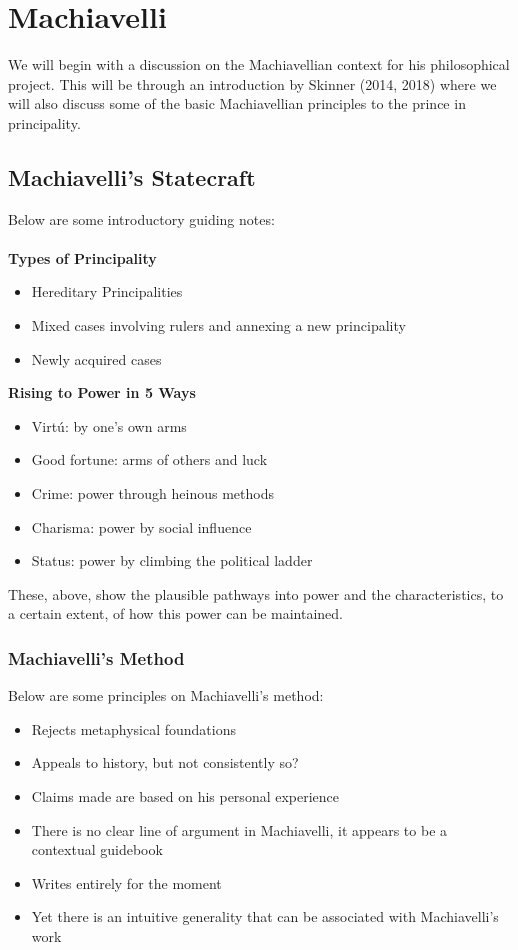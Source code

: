 \documentclass[12pt, letterpaper]{article}
\begin{document}
\newpage
\section{Machiavelli}
We will begin with a discussion on the Machiavellian context for his philosophical project. This will be through an introduction by Skinner (2014, 2018) where we will also discuss some of the basic Machiavellian principles to the prince in principality. 
\subsection{Machiavelli's Statecraft}
Below are some introductory guiding notes:\\\\
\textbf{Types of Principality}
\begin{itemize}
	\item Hereditary Principalities
	\item Mixed cases involving rulers and annexing a new principality
	\item Newly acquired cases
\end{itemize}
\textbf{Rising to Power in 5 Ways}
\begin{itemize}
	\item Virtú: by one's own arms
	\item Good fortune: arms of others and luck
	\item Crime: power through heinous methods
	\item Charisma: power by social influence
	\item Status: power by climbing the political ladder
\end{itemize}
These, above, show the plausible pathways into power and the characteristics, to a certain extent, of how this power can be maintained. 
\subsubsection{Machiavelli's Method}
Below are some principles on Machiavelli's method:
\begin{itemize}
	\item Rejects metaphysical foundations
	\item Appeals to history, but not consistently so?
	\item Claims made are based on his personal experience
	\item There is no clear line of argument in Machiavelli, it appears to be a contextual guidebook
	\item Writes entirely for the moment
	\item Yet there is an intuitive generality that can be associated with Machiavelli's work
\end{itemize}
\end{document}
